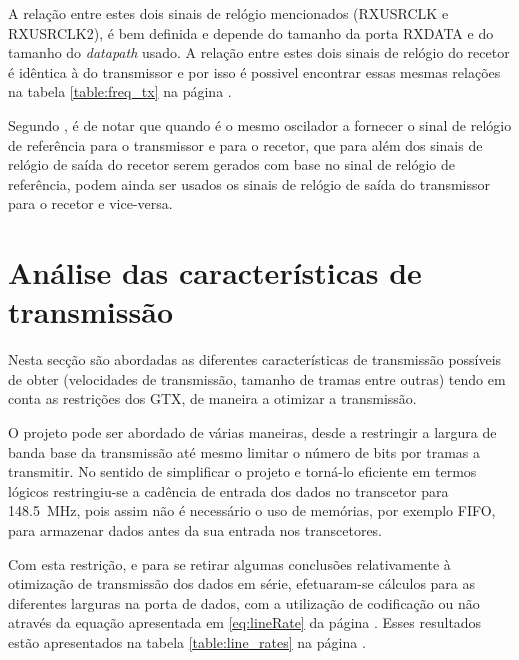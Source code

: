A relação entre estes dois sinais de relógio mencionados (RXUSRCLK e RXUSRCLK2), é bem definida e depende do tamanho da porta RXDATA e do tamanho do \textit{datapath} usado.  A relação entre estes dois sinais de relógio do recetor é idêntica à do transmissor e por isso é possivel encontrar essas mesmas relações na tabela \ref{table:freq_tx} na página \pageref{table:freq_tx}.

Segundo \cite{R011}, é de notar que quando é o mesmo oscilador a fornecer o sinal de relógio de referência para o transmissor e para o recetor, que para além dos sinais de relógio de saída do recetor serem gerados com base no sinal de relógio de referência, podem ainda ser usados os sinais de relógio de saída do transmissor para o recetor e vice-versa.

\section{Análise das características de transmissão}

Nesta secção são abordadas as diferentes características de transmissão possíveis de obter (velocidades de transmissão, tamanho de tramas entre outras) tendo em conta as restrições dos GTX, de maneira a otimizar a transmissão.

O projeto pode ser abordado de várias maneiras, desde a restringir a largura de banda base da transmissão até mesmo limitar o número de bits por tramas  a transmitir. No sentido de simplificar o projeto e torná-lo eficiente em termos lógicos restringiu-se a cadência de entrada dos dados no transcetor para \SI{148.5}{\mega\hertz}, pois assim não é necessário o uso de memórias, por exemplo FIFO, para armazenar dados antes da sua entrada nos transcetores.

Com esta restrição, e para se retirar algumas conclusões relativamente à otimização de transmissão dos dados em série, efetuaram-se cálculos para as diferentes larguras na porta de dados, com a utilização de codificação ou não através da equação apresentada em \ref{eq:lineRate} da página \pageref{eq:lineRate}. Esses resultados estão apresentados na tabela \ref{table:line_rates} na página \pageref{table:line_rates}.


